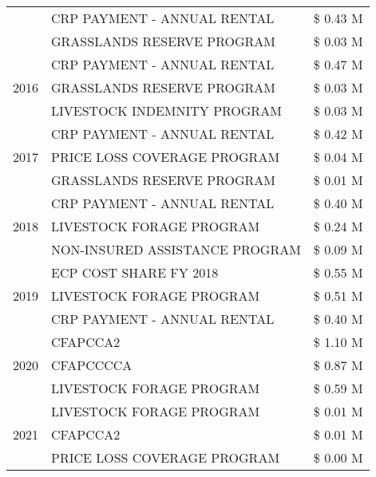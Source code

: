 \begin{tabular}{llr}
 & CRP PAYMENT - ANNUAL RENTAL & \$ 0.43 M \\
 & GRASSLANDS RESERVE PROGRAM & \$ 0.03 M \\
\cline{1-3}
\multirow[t]{3}{*}{2016} & CRP PAYMENT - ANNUAL RENTAL                   & \$ 0.47 M \\
 & GRASSLANDS RESERVE PROGRAM                    & \$ 0.03 M \\
 & LIVESTOCK INDEMNITY PROGRAM                   & \$ 0.03 M \\
\cline{1-3}
\multirow[t]{3}{*}{2017} & CRP PAYMENT - ANNUAL RENTAL & \$ 0.42 M \\
 & PRICE LOSS COVERAGE PROGRAM & \$ 0.04 M \\
 & GRASSLANDS RESERVE PROGRAM & \$ 0.01 M \\
\cline{1-3}
\multirow[t]{3}{*}{2018} & CRP PAYMENT - ANNUAL RENTAL & \$ 0.40 M \\
 & LIVESTOCK FORAGE PROGRAM & \$ 0.24 M \\
 & NON-INSURED ASSISTANCE PROGRAM & \$ 0.09 M \\
\cline{1-3}
\multirow[t]{3}{*}{2019} & ECP COST SHARE FY 2018 & \$ 0.55 M \\
 & LIVESTOCK FORAGE PROGRAM & \$ 0.51 M \\
 & CRP PAYMENT - ANNUAL RENTAL & \$ 0.40 M \\
\cline{1-3}
\multirow[t]{3}{*}{2020} & CFAPCCA2 & \$ 1.10 M \\
 & CFAPCCCCA & \$ 0.87 M \\
 & LIVESTOCK FORAGE PROGRAM & \$ 0.59 M \\
\cline{1-3}
\multirow[t]{3}{*}{2021} & LIVESTOCK FORAGE PROGRAM & \$ 0.01 M \\
 & CFAPCCA2 & \$ 0.01 M \\
 & PRICE LOSS COVERAGE PROGRAM & \$ 0.00 M \\
\cline{1-3}
\bottomrule
\end{tabular}
